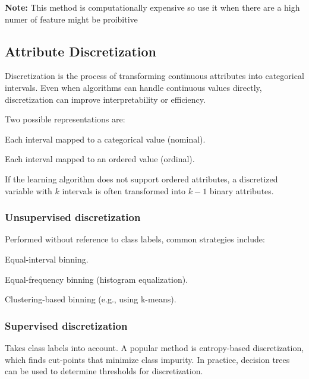     \textbf{Note:} This method is computationally expensive so use it when there are a high numer of feature might be proibitive
    
    \subsection{Attribute Discretization}
    Discretization is the process of transforming continuous attributes into categorical intervals. Even when algorithms can handle continuous values directly, discretization can improve interpretability or efficiency.
    
    Two possible representations are:
    \begin{compactitemize}
        \item Each interval mapped to a categorical value (nominal).
        \item Each interval mapped to an ordered value (ordinal).
    \end{compactitemize}
    
    If the learning algorithm does not support ordered attributes, a discretized variable with $k$ intervals is often transformed into $k-1$ binary attributes.
    
    \subsubsection*{Unsupervised discretization}
    Performed without reference to class labels, common strategies include:
    \begin{compactitemize}
        \item Equal-interval binning.
        \item Equal-frequency binning (histogram equalization).
        \item Clustering-based binning (e.g., using k-means).
    \end{compactitemize}
    
    \subsubsection*{Supervised discretization}
    Takes class labels into account. A popular method is entropy-based discretization, which finds cut-points that minimize class impurity. In practice, decision trees can be used to determine thresholds for discretization.
    
